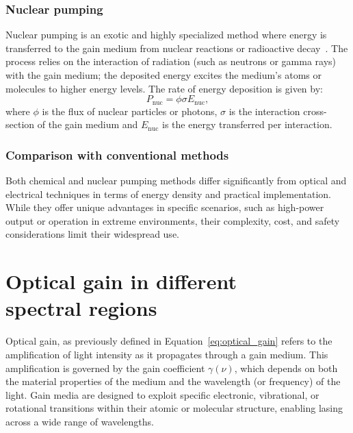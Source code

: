 \documentclass[prl,twocolumn]{revtex4-1}
\begin{document}
\subsubsection{\textbf{Nuclear pumping}}
Nuclear pumping is an exotic and highly specialized method where energy is transferred to the gain medium from nuclear reactions or radioactive decay~\cite{nuclear_pumping}. The process relies on the interaction of radiation (such as neutrons or gamma rays) with the gain medium; the deposited energy excites the medium's atoms or molecules to higher energy levels. The rate of energy deposition is given by:
\begin{equation}
    P_{\text{nuc}} = \phi \sigma E_{\text{nuc}},
\end{equation}
where $\phi$ is the flux of nuclear particles or photons, $\sigma$ is the interaction cross-section of the gain medium and $E_{\text{nuc}}$ is the energy transferred per interaction.

\subsubsection{\textbf{Comparison with conventional methods}}
Both chemical and nuclear pumping methods differ significantly from optical and electrical techniques in terms of energy density and practical implementation. While they offer unique advantages in specific scenarios, such as high-power output or operation in extreme environments, their complexity, cost, and safety considerations limit their widespread use.


\section{Optical gain in different \\ spectral regions}
Optical gain, as previously defined in Equation~\eqref{eq:optical_gain} refers to the amplification of light intensity as it propagates through a gain medium. This amplification is governed by the gain coefficient $\gamma(\nu)$, which depends on both the material properties of the medium and the wavelength (or frequency) of the light. Gain media are designed to exploit specific electronic, vibrational, or rotational transitions within their atomic or molecular structure, enabling lasing across a wide range of wavelengths.
\end{document}
